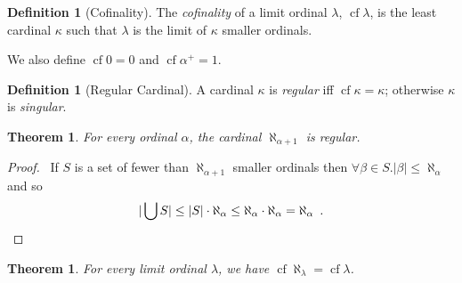 \documentclass{report}
\let\qed\relax
\newtheorem{theorem}[axiom]{Theorem}
\theoremstyle{definition}
\newtheorem{definition}[axiom]{Definition}
\newcommand{\cf}{\ensuremath{\operatorname{cf}}}
\begin{document}
    \begin{definition}[Cofinality]
        The \emph{cofinality} of a limit ordinal $\lambda$, $\cf \lambda$, is the least cardinal $\kappa$
        such that $\lambda$
        is the limit of $\kappa$ smaller ordinals.

        We also define $\cf 0 = 0$ and $\cf \alpha^+ = 1$.
    \end{definition}

    \begin{definition}[Regular Cardinal]
        A cardinal $\kappa$ is \emph{regular} iff $\cf \kappa = \kappa$; otherwise $\kappa$ is
        \emph{singular}.
    \end{definition}

    \begin{theorem}
        For every ordinal $\alpha$, the cardinal $\aleph_{\alpha + 1}$ is regular.
    \end{theorem}

    \begin{proof}
        \pf\ If $S$ is a set of fewer than $\aleph_{\alpha + 1}$ smaller ordinals then
        $\forall \beta \in S. |\beta| \leq \aleph_\alpha$ and so
        \[ |\bigcup S| \leq |S| \cdot \aleph_\alpha \leq \aleph_\alpha \cdot \aleph_\alpha = \aleph_\alpha
        \enspace . \qed \]
    \end{proof}

    \begin{theorem}
        For every limit ordinal $\lambda$, we have $\cf \aleph_\lambda = \cf \lambda$.
    \end{theorem}
\end{document}
